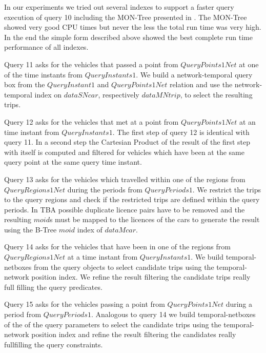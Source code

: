 \documentclass[a4paper]{article}
\begin{document}
In our experiments we tried out several indexes to support a faster query execution
of query 10 including the MON-Tree presented in \cite{MONTreeAlmeidaGeoinformatica}. The MON-Tree showed
very good CPU times but never the less the total run time was very high. In the end
the simple form described above showed the best complete run time performance of all
indexes.

Query 11 asks for the vehicles that passed a point from $QueryPoints1Net$ at one of the
time instants from $QueryInstants1$. We build a network-temporal query box from the
$QueryInstant1$ and $QueryPoints1Net$ relation and use the network-temporal index
on $dataSNcar$, respectively $dataMNtrip$, to select the resulting trips.

Query 12 asks for the vehicles that met at a point from $QueryPoints1Net$ at an time
instant from $QueryInstants1$. The first step of query 12 is identical with query 11.
In a second step the Cartesian Product of the result of the first step with itself
is computed and filtered for vehicles which have been at the same query point
at the same query time instant.

Query 13 asks for the vehicles which travelled within one of the regions from
$QueryRegions1Net$ during the periods from $QueryPeriods1$. We restrict the trips
to the query regions and check if the restricted trips are defined within the query
periods. In TBA possible duplicate licence pairs have to be removed and the
resulting $moid$s must be mapped to the licences of the cars to generate the result
using the B-Tree $moid$ index of $dataMcar$.

Query 14 asks for the vehicles that have been in one of the regions from $QueryRegions1Net$
at a time instant from $QueryInstants1$. We build temporal-netboxes from the query
objects to select candidate trips using the temporal-network position index. We refine the
result filtering the candidate trips really full filling the query predicates.

Query 15 asks for the vehicles passing a point from $QueryPoints1Net$ during a period
from $QueryPeriods1$. Analogous to query 14 we build temporal-netboxes of the
of the query parameters to select the candidate trips using the temporal-network
position index and refine the result filtering the candidates really fullfilling
the query constraints.
\end{document}

